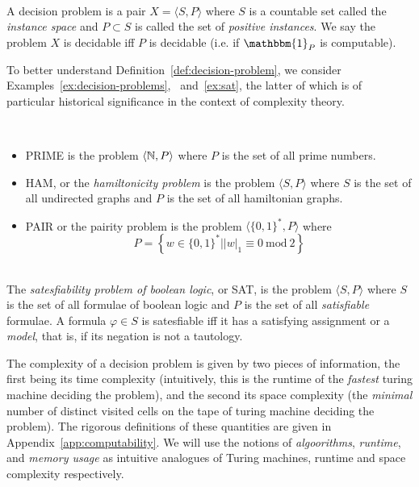     \begin{definition}\ \\
        \label{def:decision-problem}
        A decision problem is a pair \(X = \langle S, P \rangle\) where \(S\) is a countable set called the \emph{instance space} and \(P \subset S\) is called the set of \emph{positive instances}. We say the problem \(X\) is decidable iff \(P\) is decidable (i.e. if \(\mathbbm{1}_P\) is computable).
    \end{definition}

    To better understand Definition~\ref{def:decision-problem}, we consider Examples~\ref{ex:decision-problems},
    ~and~\ref{ex:sat}, the latter of which is of particular historical significance in the context of complexity theory.
    \begin{example}\ \\
        \label{ex:decision-problems}
        \begin{itemize}
            \item \textsf{PRIME} is the problem \(\langle \mathbb{N}, P\rangle\) where \(P\) is the set of all prime numbers.
            \item \textsf{HAM}, or the \emph{hamiltonicity problem} is the problem \(\langle S, P \rangle\) where \(S\) is the set of all undirected graphs and \(P\) is the set of all hamiltonian graphs.
            \item \textsf{PAIR} or the pairity problem is the problem \(\langle \{0, 1\}^\ast, P \rangle\) where 
            \[P = \left\{w\in \{0, 1\}^\ast\big| |w|_1 \equiv 0 \mathrm{\ mod\ } 2 \right\}\]
        \end{itemize}
    \end{example}

    \begin{example}\ \\
        \label{ex:sat}
        The \emph{satesfiability problem of boolean logic}, or \textsf{SAT}, is the problem \(\langle S, P\rangle\) where \(S\) is the set of all formulae of boolean logic and \(P\) is the set of all \emph{satisfiable} formulae. A formula \(\varphi \in S\) is satesfiable iff it has a satisfying assignment or a \emph{model}, that is, if its negation is not a tautology. 
    \end{example}

    The complexity of a decision problem is given by two pieces of information, the first being its time complexity (intuitively, this is the runtime of the \emph{fastest} turing machine deciding the problem), and the second its space complexity (the \emph{minimal} number of distinct visited cells on the tape of turing machine deciding the problem). The rigorous definitions of these quantities are given in Appendix~\ref{app:computability}. We will use the notions of \emph{algoorithms}, \emph{runtime}, and \emph{memory usage} as intuitive analogues of Turing machines, runtime and space complexity respectively.


